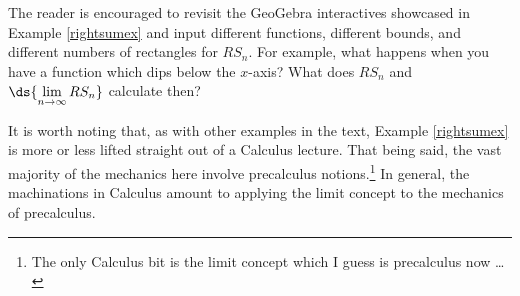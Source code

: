 \documentclass{ximera}
\begin{document}
The reader is encouraged to revisit the GeoGebra interactives showcased in Example \ref{rightsumex} and input different functions, different bounds, and different numbers of rectangles for $RS_{n}$.  For example, what happens when you have a function which dips below the $x$-axis? What does $RS_{n}$ and $\ds{\lim_{n \rightarrow \infty} RS_{n}}$ calculate then?



It is worth noting that, as with other examples in the text,  Example \ref{rightsumex} is more or less lifted straight out of  a Calculus lecture.  That being said, the vast majority of the mechanics here involve precalculus notions.\footnote{The only Calculus bit is the limit concept which I guess is precalculus now \ldots}   In general, the machinations in Calculus amount to applying the limit concept to the mechanics of precalculus.  




\closegraphsfile
\end{document}
